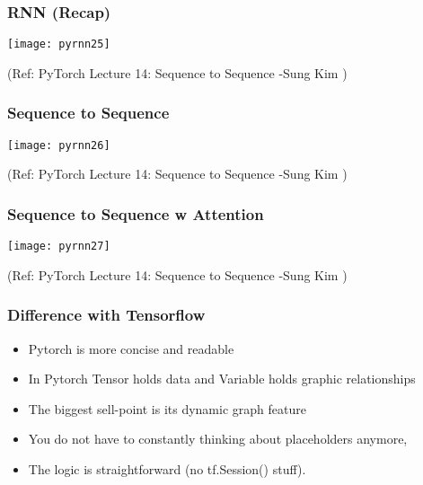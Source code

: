\begin{frame}[fragile] \frametitle{RNN (Recap)}

\begin{center}
\texttt{[image: pyrnn25]}

\tiny{(Ref:  PyTorch Lecture 14: Sequence to Sequence -Sung Kim )}
\end{center}
\end{frame}

\begin{frame}[fragile] \frametitle{Sequence to Sequence}

\begin{center}
\texttt{[image: pyrnn26]}

\tiny{(Ref:  PyTorch Lecture 14: Sequence to Sequence -Sung Kim )}
\end{center}
\end{frame}

\begin{frame}[fragile] \frametitle{Sequence to Sequence w Attention}

\begin{center}
\texttt{[image: pyrnn27]}

\tiny{(Ref:  PyTorch Lecture 14: Sequence to Sequence -Sung Kim )}
\end{center}
\end{frame}











\begin{frame}[fragile] \frametitle{Difference with Tensorflow}
\begin{itemize}
\item Pytorch is more concise and readable
\item In Pytorch Tensor holds data and Variable holds graphic relationships
\item The biggest sell-point is its dynamic graph feature
\item You do not have to constantly thinking about placeholders anymore, 
\item The logic is straightforward (no tf.Session() stuff).
\end{itemize}

\end{frame}

